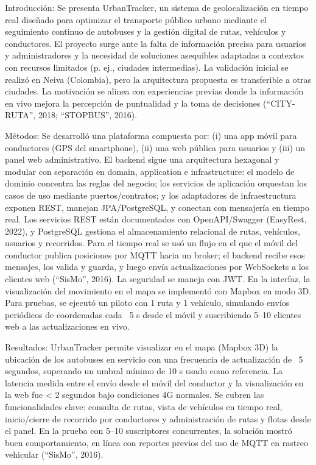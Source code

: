 Introducción:
Se presenta UrbanTracker, un sistema de geolocalización en tiempo real diseñado para optimizar el transporte público urbano mediante el seguimiento continuo de autobuses y la gestión digital de rutas, vehículos y conductores. El proyecto surge ante la falta de información precisa para usuarios y administradores y la necesidad de soluciones asequibles adaptadas a contextos con recursos limitados (p. ej., ciudades intermedias). La validación inicial se realizó en Neiva (Colombia), pero la arquitectura propuesta es transferible a otras ciudades. La motivación se alinea con experiencias previas donde la información en vivo mejora la percepción de puntualidad y la toma de decisiones (“CITY-RUTA”, 2018; “STOPBUS”, 2016).

Métodos:
Se desarrolló una plataforma compuesta por: (i) una app móvil para conductores (GPS del smartphone), (ii) una web pública para usuarios y (iii) un panel web administrativo. El backend sigue una arquitectura hexagonal y modular con separación en domain, application e infrastructure: el modelo de dominio concentra las reglas del negocio; los servicios de aplicación orquestan los casos de uso mediante puertos/contratos; y los adaptadores de infraestructura exponen REST, manejan JPA/PostgreSQL, y conectan con mensajería en tiempo real. Los servicios REST están documentados con OpenAPI/Swagger (EasyRest, 2022), y PostgreSQL gestiona el almacenamiento relacional de rutas, vehículos, usuarios y recorridos.
Para el tiempo real se usó un flujo en el que el móvil del conductor publica posiciones por MQTT hacia un broker; el backend recibe esos mensajes, los valida y guarda, y luego envía actualizaciones por WebSockets a los clientes web (“SisMo”, 2016). La seguridad se maneja con JWT. En la interfaz, la visualización del movimiento en el mapa se implementó con Mapbox en modo 3D.
Para pruebas, se ejecutó un piloto con 1 ruta y 1 vehículo, simulando envíos periódicos de coordenadas cada ~5 s desde el móvil y suscribiendo 5–10 clientes web a las actualizaciones en vivo.

Resultados:
UrbanTracker permite visualizar en el mapa (Mapbox 3D) la ubicación de los autobuses en servicio con una frecuencia de actualización de ~5 segundos, superando un umbral mínimo de 10 s usado como referencia. La latencia medida entre el envío desde el móvil del conductor y la visualización en la web fue < 2 segundos bajo condiciones 4G normales. Se cubren las funcionalidades clave: consulta de rutas, vista de vehículos en tiempo real, inicio/cierre de recorrido por conductores y administración de rutas y flotas desde el panel. En la prueba con 5–10 suscriptores concurrentes, la solución mostró buen comportamiento, en línea con reportes previos del uso de MQTT en rastreo vehicular (“SisMo”, 2016).

